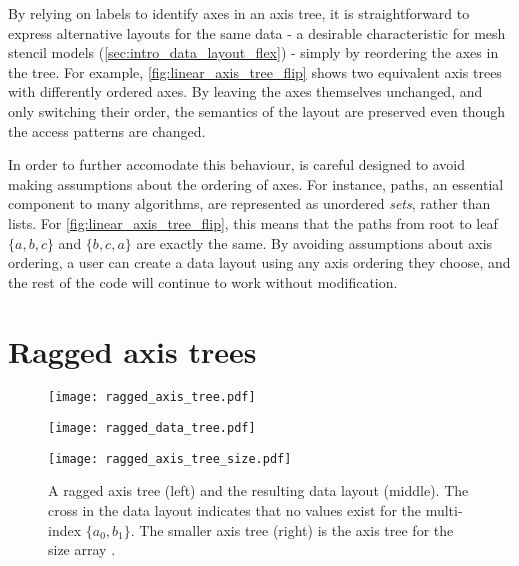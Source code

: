 \documentclass[thesis]{subfiles}
\begin{document}
By relying on labels to identify axes in an axis tree, it is straightforward to express alternative layouts for the same data - a desirable characteristic for mesh stencil models (\cref{sec:intro_data_layout_flex}) - simply by reordering the axes in the tree.
For example, \cref{fig:linear_axis_tree_flip} shows two equivalent axis trees with differently ordered axes.
By leaving the axes themselves unchanged, and only switching their order, the semantics of the layout are preserved even though the access patterns are changed.

In order to further accomodate this behaviour,  is careful designed to avoid making assumptions about the ordering of axes.
For instance, paths, an essential component to many algorithms, are represented as unordered \emph{sets}, rather than lists.
For \cref{fig:linear_axis_tree_flip}, this means that the paths from root to leaf $\{ a, b, c \}$ and $\{ b, c, a \}$ are exactly the same.
By avoiding assumptions about axis ordering, a user can create a data layout using any axis ordering they choose, and the rest of the code will continue to work without modification.

\section{Ragged axis trees}
\label{sec:ragged_axis_trees}

\begin{figure}
  \centering
  \begin{minipage}{.35\textwidth}
    \begin{center}
      \texttt{[image: ragged\_axis\_tree.pdf]}
    \end{center}
  \end{minipage}
  \begin{minipage}{.4\textwidth}
    \begin{center}
      \texttt{[image: ragged\_data\_tree.pdf]}
    \end{center}
  \end{minipage}
  \begin{minipage}{.2\textwidth}
    \begin{center}
      \texttt{[image: ragged\_axis\_tree\_size.pdf]}
    \end{center}
  \end{minipage}
  \caption{
    A ragged axis tree (left) and the resulting data layout (middle).
    The cross in the data layout indicates that no values exist for the multi-index $\{a_0, b_1\}$.
    The smaller axis tree (right) is the axis tree for the size array \pycode{[[1, 0], [2, 1]][?$i_a$?, ?$i_b$?]}.
  }
  \label{fig:ragged_axis_tree}
\end{figure}
\end{document}
